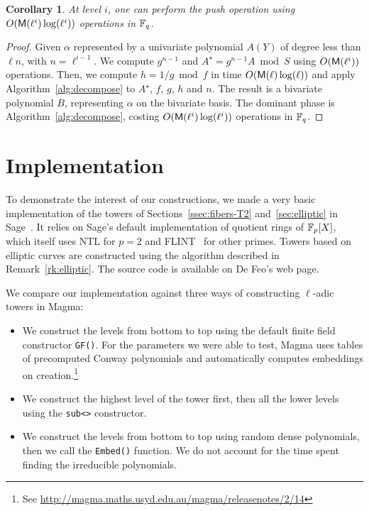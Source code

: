 \documentclass{sig-alternate}
\newtheorem{corollary}[definition]{Corollary}
\begin{document}
\begin{corollary}
  At level $i$, one can perform the push operation using
  $O(\mathsf{M}(\ell^i)\log(\ell^i))$ operations in $\mathbb{F}_q$.
\end{corollary}
\begin{proof}
  Given $\alpha$ represented by a univariate polynomial $A(Y)$ of
  degree less than $\ell n$, with $n =\ell^{i-1}$. We compute
  $g^{n-1}$ and $A^\star = g^{n-1} A \bmod S$ using $O(\mathsf{M}(\ell^i))$
  operations. Then, we compute $h=1/g \bmod f$ in time
  $O(\mathsf{M}(\ell)\log(\ell))$ and apply Algorithm~\ref{alg:decompose}
  to $A^\star$, $f$, $g$, $h$ and $n$. The result is a bivariate
  polynomial $B$, representing $\alpha$ on the bivariate basis. The
  dominant phase is Algorithm~\ref{alg:decompose}, costing
  $O(\mathsf{M}(\ell^i)\log(\ell^i))$ operations in $\mathbb{F}_q$.
\end{proof}


\section{Implementation}
\label{sec:impl}
To demonstrate the interest of our constructions, we made a very basic
implementation of the towers of Sections~\ref{ssec:fibers-T2}
and~\ref{sec:elliptic} in Sage~\cite{Sage}. It relies on Sage's
default implementation of quotient rings of $\mathbb{F}_p[X]$, which itself
uses NTL \cite{shoup2003ntl} for $p=2$ and FLINT~\cite{hart2010flint}
for other primes. Towers based on elliptic curves are constructed
using the algorithm described in Remark~\ref{rk:elliptic}. The source
code is available on De Feo's web page.

We compare our implementation against three ways of constructing
$\ell$-adic towers in Magma:
\begin{itemize}
\item We construct the levels from bottom to top using the default
  finite field constructor \verb+GF()+. For the parameters we were
  able to test, Magma uses tables of precomputed Conway polynomials
  and automatically computes embeddings on
  creation.\footnote{See \url{http://magma.maths.usyd.edu.au/magma/releasenotes/2/14}}
\item We construct the highest level of the tower first, then all the
  lower levels using the \verb+sub<>+ constructor.
\item We construct the levels from bottom to top using random dense
  polynomials, then we call the \verb+Embed()+ function.  We do not
  account for the time spent finding the irreducible polynomials.
\end{itemize}
\end{document}
